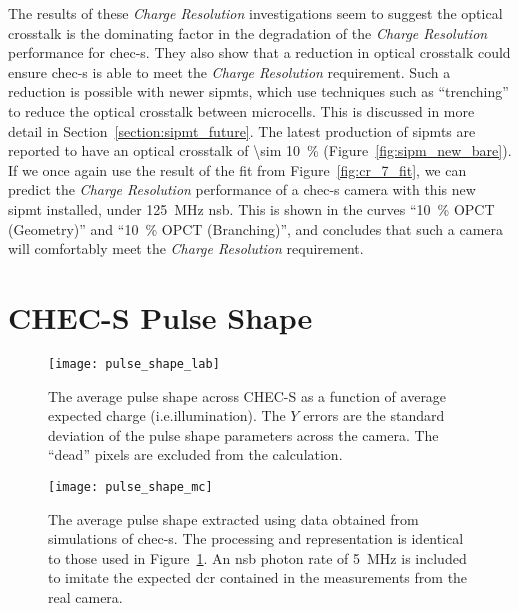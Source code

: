 The results of these \textit{Charge Resolution} investigations seem to suggest the optical crosstalk is the dominating factor in the degradation of the \textit{Charge Resolution} performance for \gls{chec-s}. They also show that a reduction in optical crosstalk could ensure \gls{chec-s} is able to meet the \textit{Charge Resolution} requirement. Such a reduction is possible with newer \glspl{sipmt}, which use techniques such as ``trenching'' to reduce the optical crosstalk between microcells. This is discussed in more detail in Section~\ref{section:sipmt_future}. The latest production of \glspl{sipmt} are reported to have an optical crosstalk of \SI{\sim 10}{\percent} (Figure~\ref{fig:sipm_new_bare}). If we once again use the result of the fit from Figure~\ref{fig:cr_7_fit}, we can predict the \textit{Charge Resolution} performance of a \gls{chec-s} camera with this new \gls{sipmt} installed, under \SI{125}{MHz} \gls{nsb}. This is shown in the curves ``\SI{10}{\percent} OPCT (Geometry)'' and ``\SI{10}{\percent} OPCT (Branching)'', and concludes that such a camera will comfortably meet the \textit{Charge Resolution} requirement.

\section{CHEC-S Pulse Shape} \label{section:pulse_shape_results}

\begin{figure}
	\centering
    \texttt{[image: pulse\_shape\_lab]} 
	\caption[Pulse shape versus average expected charge for CHEC-S.]{The average pulse shape across CHEC-S as a function of average expected charge (i.e.\@ illumination). The $Y$ errors are the standard deviation of the pulse shape parameters across the camera. The ``dead'' pixels are excluded from the calculation.}
	\label{fig:pulse_shape_lab}
\end{figure}

\begin{figure}
	\centering
    \texttt{[image: pulse\_shape\_mc]} 
	\caption[Pulse shape versus average expected charge for a CHEC-S simulation.]{The average pulse shape extracted using data obtained from simulations of \gls{chec-s}. The processing and representation is identical to those used in Figure~\ref{fig:pulse_shape_lab}. An \gls{nsb} photon rate of \SI{5}{MHz} is included to imitate the expected \gls{dcr} contained in the measurements from the real camera.}
	\label{fig:pulse_shape_mc}
\end{figure}

